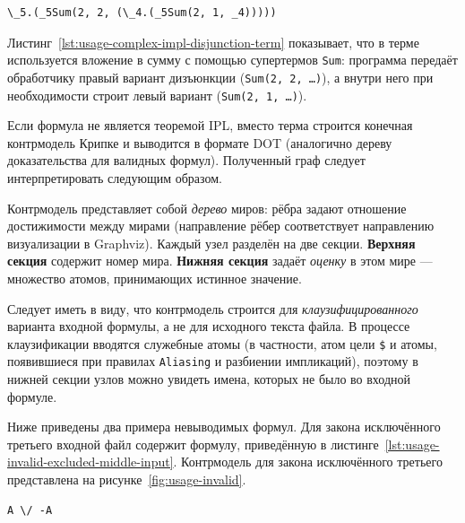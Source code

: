 \documentclass[14pt, russian]{scrartcl}
\begin{document}
\begin{listing}[!htb]
\caption{Редуцированный терм для \texttt{complex-impl-disjunction.txt}}
\label{lst:usage-complex-impl-disjunction-term}
\begin{verbatim}
\_5.(_5Sum(2, 2, (\_4.(_5Sum(2, 1, _4)))))
\end{verbatim}
\end{listing}

Листинг~\ref{lst:usage-complex-impl-disjunction-term} показывает, что в терме
используется вложение в сумму с помощью супертермов \texttt{Sum}: программа
передаёт обработчику правый вариант дизъюнкции (\texttt{Sum(2, 2, \ldots)}),
а внутри него при необходимости строит левый вариант (\texttt{Sum(2, 1, \ldots)}).

Если формула не является теоремой IPL, вместо терма строится конечная
контрмодель Крипке и выводится в формате DOT (аналогично дереву доказательства
для валидных формул). Полученный граф следует интерпретировать следующим
образом.

Контрмодель представляет собой \emph{дерево} миров: рёбра задают отношение
достижимости между мирами (направление рёбер соответствует направлению
визуализации в Graphviz). Каждый узел разделён на две секции. \textbf{Верхняя
секция} содержит номер мира. \textbf{Нижняя секция} задаёт \emph{оценку} в
этом мире --- множество атомов, принимающих истинное значение.

Следует иметь в виду, что контрмодель строится для \emph{клаузифицированного}
варианта входной формулы, а не для исходного текста файла. В процессе
клаузификации вводятся служебные атомы (в частности, атом цели \texttt{\$} и
атомы, появившиеся при правилах \texttt{Aliasing} и разбиении импликаций),
поэтому в нижней секции узлов можно увидеть имена, которых не было во входной
формуле.

Ниже приведены два примера невыводимых формул. Для закона исключённого третьего
входной файл содержит формулу, приведённую в
листинге~\ref{lst:usage-invalid-excluded-middle-input}. Контрмодель для закона
исключённого третьего представлена на
рисунке~\ref{fig:usage-invalid}.


\begin{listing}[!htb]
\caption{Входная формула \texttt{invalid-excluded-middle.txt}}
\label{lst:usage-invalid-excluded-middle-input}
\begin{verbatim}
A \/ -A
\end{verbatim}
\end{listing}
\end{document}
